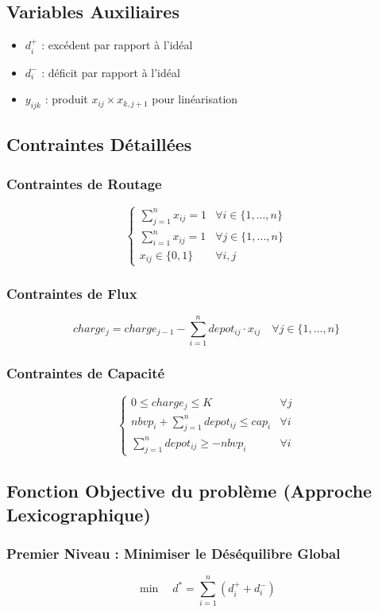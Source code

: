 \documentclass{article}
\begin{document}
\subsection{Variables Auxiliaires}
\begin{itemize}
    \item $d_i^+$ : excédent par rapport à l'idéal
    \item $d_i^-$ : déficit par rapport à l'idéal
    \item $y_{ijk}$ : produit $x_{ij} \times x_{k,j+1}$ pour linéarisation
\end{itemize}

\subsection{Contraintes Détaillées}
\subsubsection{Contraintes de Routage}
\[
\begin{cases}
\sum_{j=1}^n x_{ij} = 1 & \forall i \in \{1,...,n\} \\
\sum_{i=1}^n x_{ij} = 1 & \forall j \in \{1,...,n\} \\
x_{ij} \in \{0,1\} & \forall i,j
\end{cases}
\]

\subsubsection{Contraintes de Flux}
\[
charge_j = charge_{j-1} - \sum_{i=1}^n depot_{ij} \cdot x_{ij} \quad \forall j \in \{1,...,n\}
\]

\subsubsection{Contraintes de Capacité}
\[
\begin{cases}
0 \leq charge_j \leq K & \forall j \\
nbvp_i + \sum_{j=1}^n depot_{ij} \leq cap_i & \forall i \\
\sum_{j=1}^n depot_{ij} \geq -nbvp_i & \forall i
\end{cases}
\]

\subsection{Fonction Objective du problème (Approche Lexicographique)}
\subsubsection{Premier Niveau : Minimiser le Déséquilibre Global}
\[
\min \quad d^* = \sum_{i=1}^n (d_i^+ + d_i^-)
\]
\end{document}
